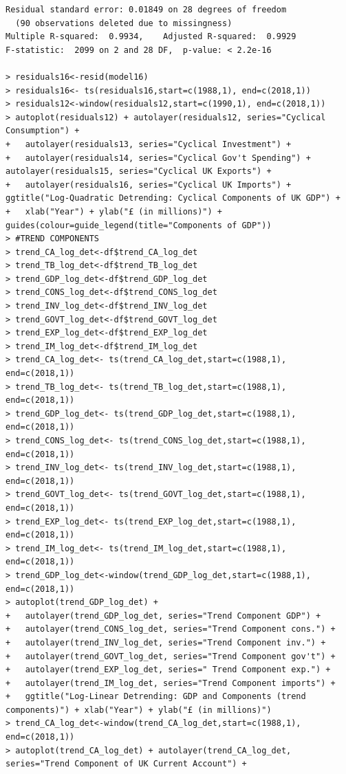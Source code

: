 \documentclass[12pt]{article}
\begin{document}
\begin{verbatim}
Residual standard error: 0.01849 on 28 degrees of freedom
  (90 observations deleted due to missingness)
Multiple R-squared:  0.9934,	Adjusted R-squared:  0.9929 
F-statistic:  2099 on 2 and 28 DF,  p-value: < 2.2e-16

> residuals16<-resid(model16)
> residuals16<- ts(residuals16,start=c(1988,1), end=c(2018,1))
> residuals12<-window(residuals12,start=c(1990,1), end=c(2018,1)) 
> autoplot(residuals12) + autolayer(residuals12, series="Cyclical Consumption") + 
+   autolayer(residuals13, series="Cyclical Investment") +
+   autolayer(residuals14, series="Cyclical Gov't Spending") + autolayer(residuals15, series="Cyclical UK Exports") +
+   autolayer(residuals16, series="Cyclical UK Imports") + ggtitle("Log-Quadratic Detrending: Cyclical Components of UK GDP") + 
+   xlab("Year") + ylab("£ (in millions)") + guides(colour=guide_legend(title="Components of GDP"))
> #TREND COMPONENTS
> trend_CA_log_det<-df$trend_CA_log_det
> trend_TB_log_det<-df$trend_TB_log_det
> trend_GDP_log_det<-df$trend_GDP_log_det
> trend_CONS_log_det<-df$trend_CONS_log_det
> trend_INV_log_det<-df$trend_INV_log_det
> trend_GOVT_log_det<-df$trend_GOVT_log_det
> trend_EXP_log_det<-df$trend_EXP_log_det	
> trend_IM_log_det<-df$trend_IM_log_det
> trend_CA_log_det<- ts(trend_CA_log_det,start=c(1988,1), end=c(2018,1))
> trend_TB_log_det<- ts(trend_TB_log_det,start=c(1988,1), end=c(2018,1))
> trend_GDP_log_det<- ts(trend_GDP_log_det,start=c(1988,1), end=c(2018,1))
> trend_CONS_log_det<- ts(trend_CONS_log_det,start=c(1988,1), end=c(2018,1))
> trend_INV_log_det<- ts(trend_INV_log_det,start=c(1988,1), end=c(2018,1))
> trend_GOVT_log_det<- ts(trend_GOVT_log_det,start=c(1988,1), end=c(2018,1))
> trend_EXP_log_det<- ts(trend_EXP_log_det,start=c(1988,1), end=c(2018,1))
> trend_IM_log_det<- ts(trend_IM_log_det,start=c(1988,1), end=c(2018,1))
> trend_GDP_log_det<-window(trend_GDP_log_det,start=c(1988,1), end=c(2018,1)) 
> autoplot(trend_GDP_log_det) +
+   autolayer(trend_GDP_log_det, series="Trend Component GDP") +
+   autolayer(trend_CONS_log_det, series="Trend Component cons.") +
+   autolayer(trend_INV_log_det, series="Trend Component inv.") +
+   autolayer(trend_GOVT_log_det, series="Trend Component gov't") +
+   autolayer(trend_EXP_log_det, series=" Trend Component exp.") +
+   autolayer(trend_IM_log_det, series="Trend Component imports") +
+   ggtitle("Log-Linear Detrending: GDP and Components (trend components)") + xlab("Year") + ylab("£ (in millions)")
> trend_CA_log_det<-window(trend_CA_log_det,start=c(1988,1), end=c(2018,1)) 
> autoplot(trend_CA_log_det) + autolayer(trend_CA_log_det, series="Trend Component of UK Current Account") +

\end{verbatim}
\end{document}
